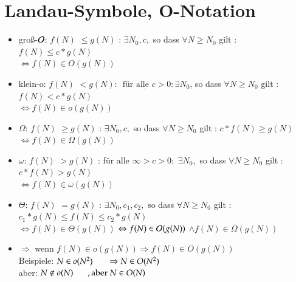 \section{Landau-Symbole, O-Notation}
\begin{itemize}[label={}]
    \item groß-$\mathcal{O}{}$: \hspace*{5mm}$f(N)$ \glqq $\leq$\grqq $g(N)$ : $\exists N_0, c, $ so dass $\forall N \geq N_0$ gilt : $f(N) \leq c * g(N)$\\
    \hspace*{4.5cm}$\Leftrightarrow f(N) \in O(g(N))$

    \item klein-o:  \hspace*{5mm}$f(N)$ \glqq $<$\grqq $g(N) $: $\underline{\text{ für alle } c>0} : \exists N_0 $, so dass $\forall N \geq N_0$ gilt : $f(N) < c * g(N)$\\
    \hspace*{4.5cm}$\Leftrightarrow f(N) \in o(g(N))$

    \item $\Omega$:  \hspace*{5mm}$f(N)$ \glqq $\geq$\grqq $g(N)$ : $\exists N_0, c, $ so dass $\forall N \geq N_0$ gilt : $c *f(N) \geq  g(N)$\\
    \hspace*{4.5cm}$\Leftrightarrow f(N) \in \Omega (g(N))$

    \item $\omega$:  \hspace*{5mm}$f(N)$ \glqq $>$\grqq $g(N)$ : für alle $\infty > c > 0:$ $\exists N_0, $ so dass $\forall N \geq N_0$ gilt : $c* f(N) > g(N)$\\
    \hspace*{4.5cm}$\Leftrightarrow f(N) \in \omega (g(N))$

    \item $\Theta$:  \hspace*{5mm}$f(N)$ \glqq $=$\grqq $g(N)$ : $\exists N_0, c_1, c_2, $ so dass $\forall N \geq N_0$ gilt : $c_1 * g(N) \leq f(N) \leq c_2 * g(N) $\\
    \hspace*{4.5cm}$\Leftrightarrow f(N) \in \Theta (g(N))$ $\Leftrightarrow f(N) \in \mathcal{O}{} (g(N))$ $\land f(N) \in \Omega (g(N))$

    \item $\Rightarrow$ wenn  $f(N) \in o(g(N)) \Rightarrow f(N) \in O(g(N))$ \\
    Beispiele: $N \in o(N^2) \hspace*{0.6cm} \Rightarrow N \in O(N^2)$ \\
    \hspace*{0.65cm} aber: $N \not\in o(N) \hspace*{0.6cm} , \text{aber }N \in O(N)$\\
\end{itemize}

